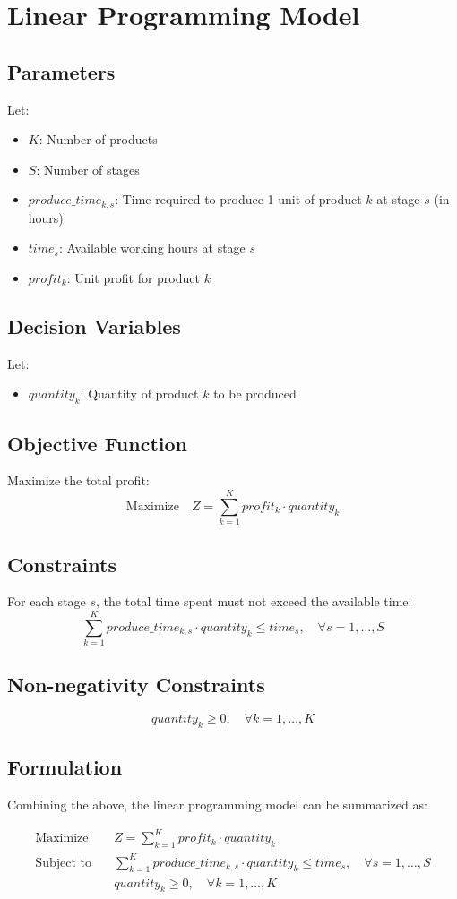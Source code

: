 \documentclass{article}
\begin{document}
\section*{Linear Programming Model}

\subsection*{Parameters}
Let:
\begin{itemize}
    \item $K$: Number of products
    \item $S$: Number of stages
    \item $produce\_time_{k,s}$: Time required to produce 1 unit of product $k$ at stage $s$ (in hours)
    \item $time_{s}$: Available working hours at stage $s$
    \item $profit_{k}$: Unit profit for product $k$
\end{itemize}

\subsection*{Decision Variables}
Let:
\begin{itemize}
    \item $quantity_{k}$: Quantity of product $k$ to be produced
\end{itemize}

\subsection*{Objective Function}
Maximize the total profit:
\[
\text{Maximize} \quad Z = \sum_{k=1}^{K} profit_{k} \cdot quantity_{k}
\]

\subsection*{Constraints}
For each stage $s$, the total time spent must not exceed the available time:
\[
\sum_{k=1}^{K} produce\_time_{k,s} \cdot quantity_{k} \leq time_{s}, \quad \forall s = 1, \ldots, S
\]

\subsection*{Non-negativity Constraints}
\[
quantity_{k} \geq 0, \quad \forall k = 1, \ldots, K
\]

\subsection*{Formulation}
Combining the above, the linear programming model can be summarized as:

\begin{align*}
\text{Maximize} \quad & Z = \sum_{k=1}^{K} profit_{k} \cdot quantity_{k} \\
\text{Subject to} \quad & \sum_{k=1}^{K} produce\_time_{k,s} \cdot quantity_{k} \leq time_{s}, \quad \forall s = 1, \ldots, S \\
& quantity_{k} \geq 0, \quad \forall k = 1, \ldots, K
\end{align*}
\end{document}
